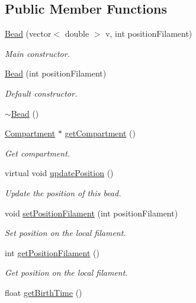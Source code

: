 \subsection*{Public Member Functions}
\begin{DoxyCompactItemize}
\item 
\hyperlink{classBead_aa91581c9111d101b95bec920798e22ac}{Bead} (vector$<$ double $>$ v, int position\+Filament)
\begin{DoxyCompactList}\small\item\em Main constructor. \end{DoxyCompactList}\item 
\hyperlink{classBead_a5bb15ab11fee13f78721759cadb5a5b4}{Bead} (int position\+Filament)
\begin{DoxyCompactList}\small\item\em Default constructor. \end{DoxyCompactList}\item 
\hyperlink{classBead_a21f0ccd7041f56c4038171d0da3a58ed}{$\sim$\+Bead} ()
\item 
\hyperlink{classCompartment}{Compartment} $\ast$ \hyperlink{classBead_ae6cfcc2936a2e12a3887c9fd824c6343}{get\+Compartment} ()
\begin{DoxyCompactList}\small\item\em Get compartment. \end{DoxyCompactList}\item 
virtual void \hyperlink{classBead_adfda91d08764f284b4a23c05da34c84c}{update\+Position} ()
\begin{DoxyCompactList}\small\item\em Update the position of this bead. \end{DoxyCompactList}\item 
void \hyperlink{classBead_a3178379864ec93ff5e9f8a2e7916c94a}{set\+Position\+Filament} (int position\+Filament)
\begin{DoxyCompactList}\small\item\em Set position on the local filament. \end{DoxyCompactList}\item 
int \hyperlink{classBead_a3df2bf2b6063545ba9a68b890004057e}{get\+Position\+Filament} ()
\begin{DoxyCompactList}\small\item\em Get position on the local filament. \end{DoxyCompactList}\item 
float \hyperlink{classBead_afa239062c738d1db95a1456c9b357a68}{get\+Birth\+Time} ()

\end{DoxyCompactItemize}
